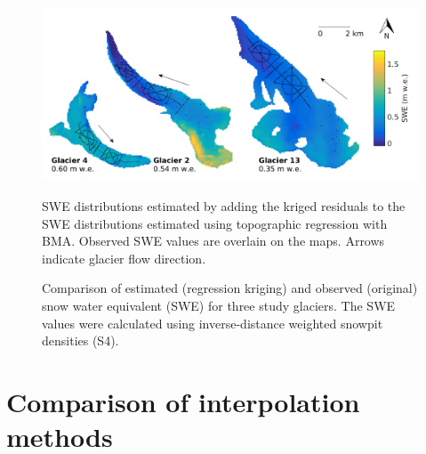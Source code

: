 \documentclass{sfuthesis}
\newcommand{\swedots}{Observed SWE values are overlain on the maps. }
\begin{document}
\begin{figure}[H]
	\centering
	\includegraphics[width = \textwidth]{RegressionKriging.png}\\
	\caption{SWE distributions estimated by adding the kriged residuals to the SWE distributions estimated using topographic regression with BMA. \swedots Arrows indicate glacier flow direction.}
	\label{fig:Regression-Kriging}
\end{figure}

\begin{figure}[H]
	\caption{Comparison of estimated (regression kriging) and observed (original) snow water equivalent (SWE) for three study glaciers. The SWE values were calculated using inverse-distance weighted snowpit densities (S4).}
	\label{fig:R2regressionkrig}
\end{figure}


\section{Comparison of interpolation methods}
\end{document}
